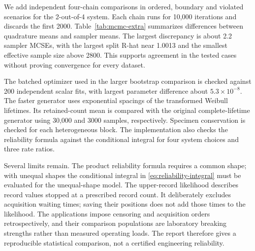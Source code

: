 We add independent four-chain comparisons in ordered, boundary and violated scenarios for the 2-out-of-4 system. Each chain runs for 10,000 iterations and discards the first 2000. Table~\ref{tab:mcmc-extra} summarizes differences between quadrature means and sampler means. The largest discrepancy is about 2.2 sampler MCSEs, with the largest split R-hat near 1.0013 and the smallest effective sample size above 2800. This supports agreement in the tested cases without proving convergence for every dataset.



The batched optimizer used in the larger bootstrap comparison is checked against 200 independent scalar fits, with largest parameter difference about $5.3\times10^{-8}$. The faster generator uses exponential spacings of the transformed Weibull lifetimes. Its retained-count mean is compared with the original complete-lifetime generator using 30,000 and 3000 samples, respectively. Specimen conservation is checked for each heterogeneous block. The implementation also checks the reliability formula against the conditional integral for four system choices and three rate ratios.

Several limits remain. The product reliability formula requires a common shape; with unequal shapes the conditional integral in \eqref{eq:reliability-integral} must be evaluated for the unequal-shape model. The upper-record likelihood describes record values stopped at a prescribed record count. It deliberately excludes acquisition waiting times; saving their positions does not add those times to the likelihood. The applications impose censoring and acquisition orders retrospectively, and their comparison populations are laboratory breaking strengths rather than measured operating loads. The report therefore gives a reproducible statistical comparison, not a certified engineering reliability.
\FloatBarrier
